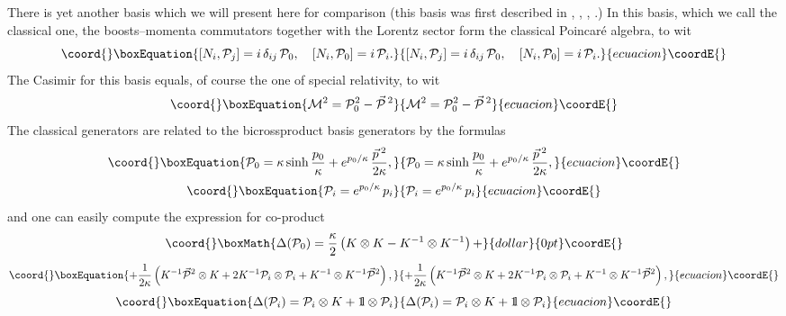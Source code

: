 \documentclass[a4paper,a4paper]{article}
\def\bbbone{{\mathchoice {\rm 1\mskip-4mu l} {\rm 1\mskip-4mu l}
{\rm 1\mskip-4.5mu l} {\rm 1\mskip-5mu l}}}
\begin{document}
There is yet another basis which we will present here for
comparison (this basis was first described in \cite{maslanka},
\cite{kolumaso}, \cite{lukclas}, \cite{luruza}.) In this basis,
which we call the classical one, the boosts--momenta commutators
together with the Lorentz sector form the classical Poincar\'e
algebra, to wit
\begin{equation}\coord{}\boxEquation{\label{12}
   \left[N_{i}, {\cal P}_{j}\right] = i\, \delta_{ij}\, {\cal P}_0  ,\quad \left[N_{i}, {\cal P}_{0}\right] = i\,
   {\cal P}_i.
}{\left[N_{i}, {\cal P}_{j}\right] = i\, \delta_{ij}\, {\cal P}_0  ,\quad \left[N_{i}, {\cal P}_{0}\right] = i\,
   {\cal P}_i.
}{ecuacion}\coordE{}\end{equation}
The Casimir for this basis equals, of course the one of special relativity, to wit
\begin{equation}\coord{}\boxEquation{\label{12a}
 {\cal M}^2 = {\cal P}_0^2 - \vec{\cal P}\,{}^2
}{{\cal M}^2 = {\cal P}_0^2 - \vec{\cal P}\,{}^2
}{ecuacion}\coordE{}\end{equation}
The classical generators \coordHE{} are related to the bicrossproduct basis generators by the formulas
\begin{equation}\coord{}\boxEquation{\label{13}
 {\cal P}_{0} = \kappa \sinh\frac{p_0}\kappa + e^{p_0/\kappa}\, \frac{\vec{p}\, {}^2}{2\kappa},
}{{\cal P}_{0} = \kappa \sinh\frac{p_0}\kappa + e^{p_0/\kappa}\, \frac{\vec{p}\, {}^2}{2\kappa},
}{ecuacion}\coordE{}\end{equation}
\begin{equation}\coord{}\boxEquation{\label{14}
 {\cal P}_{i}= e^{p_0/\kappa} \, p_i
}{{\cal P}_{i}= e^{p_0/\kappa} \, p_i
}{ecuacion}\coordE{}\end{equation}
and one can easily compute the expression for co-product
$$\coord{}\boxMath{
  \Delta({\cal P}_{0}) = \frac\kappa2\left(K \otimes K - K^{-1}\otimes K^{-1}\right)+}{dollar}{0pt}\coordE{}$$
  \begin{equation}\coord{}\boxEquation{\label{15}
  + \frac1{2\kappa}\left(K^{-1} \vec{{\cal P}}{}^2 \otimes K +
  2K^{-1} {\cal P}_i \otimes {\cal P}_i + K^{-1}\otimes K^{-1}\vec{{\cal P}}{}^2\right),
}{+ \frac1{2\kappa}\left(K^{-1} \vec{{\cal P}}{}^2 \otimes K +
  2K^{-1} {\cal P}_i \otimes {\cal P}_i + K^{-1}\otimes K^{-1}\vec{{\cal P}}{}^2\right),
}{ecuacion}\coordE{}\end{equation}
\begin{equation}\coord{}\boxEquation{\label{15a}
 \Delta({\cal P}_{i}) ={\cal P}_{i}\otimes K + \bbbone\otimes {\cal P}_{i}
}{\Delta({\cal P}_{i}) ={\cal P}_{i}\otimes K + \bbbone\otimes {\cal P}_{i}
}{ecuacion}\coordE{}\end{equation}
\end{document}

